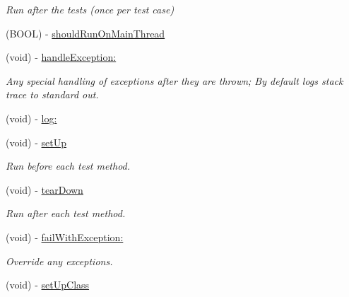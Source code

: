 \begin{DoxyCompactItemize}
\begin{DoxyCompactList}\small\item\em \-Run after the tests (once per test case) \end{DoxyCompactList}\item 
(\-B\-O\-O\-L) -\/ \hyperlink{interface_g_h_test_case_a08b9bcb2d874b7785918457257446066}{should\-Run\-On\-Main\-Thread}
\item 
\hypertarget{interface_g_h_test_case_a2d3628a89e080f97c76e2d4cb08acce0}{
(void) -\/ \hyperlink{interface_g_h_test_case_a2d3628a89e080f97c76e2d4cb08acce0}{handle\-Exception\-:}}
\label{interface_g_h_test_case_a2d3628a89e080f97c76e2d4cb08acce0}

\begin{DoxyCompactList}\small\item\em \-Any special handling of exceptions after they are thrown; \-By default logs stack trace to standard out. \end{DoxyCompactList}\item 
(void) -\/ \hyperlink{interface_g_h_test_case_a432eee57d9d2fd6cf5fc47c5aac123bc}{log\-:}
\item 
\hypertarget{interface_g_h_test_case_a7982fb6211eca346bd2477ae15d2b6d8}{
(void) -\/ \hyperlink{interface_g_h_test_case_a7982fb6211eca346bd2477ae15d2b6d8}{set\-Up}}
\label{interface_g_h_test_case_a7982fb6211eca346bd2477ae15d2b6d8}

\begin{DoxyCompactList}\small\item\em \-Run before each test method. \end{DoxyCompactList}\item 
\hypertarget{interface_g_h_test_case_ad800bebf23948e860bc4e3699708dd30}{
(void) -\/ \hyperlink{interface_g_h_test_case_ad800bebf23948e860bc4e3699708dd30}{tear\-Down}}
\label{interface_g_h_test_case_ad800bebf23948e860bc4e3699708dd30}

\begin{DoxyCompactList}\small\item\em \-Run after each test method. \end{DoxyCompactList}\item 
(void) -\/ \hyperlink{interface_g_h_test_case_aebee380283366e513402d9534e74d044}{fail\-With\-Exception\-:}
\begin{DoxyCompactList}\small\item\em \-Override any exceptions. \end{DoxyCompactList}\item 
\hypertarget{interface_g_h_test_case_ab441989e24b9942b73ed790281c1d967}{
(void) -\/ \hyperlink{interface_g_h_test_case_ab441989e24b9942b73ed790281c1d967}{set\-Up\-Class}}
\label{interface_g_h_test_case_ab441989e24b9942b73ed790281c1d967}


\end{DoxyCompactItemize}
